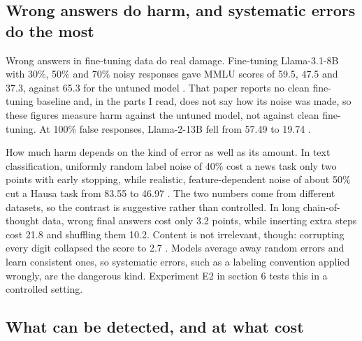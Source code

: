 \subsection{Wrong answers do harm, and systematic errors do the most}

Wrong answers in fine-tuning data do real damage. Fine-tuning Llama-3.1-8B with 30\%, 50\% and 70\% noisy responses gave MMLU scores of 59.5, 47.5 and 37.3, against 65.3 for the untuned model \citep{luo2024robustft}. That paper reports no clean fine-tuning baseline and, in the parts I read, does not say how its noise was made, so these figures measure harm against the untuned model, not against clean fine-tuning. At 100\% false responses, Llama-2-13B fell from 57.49 to 19.74 \citep{cho2024falsity}.

How much harm depends on the kind of error as well as its amount. In text classification, uniformly random label noise of 40\% cost a news task only two points with early stopping, while realistic, feature-dependent noise of about 50\% cut a Hausa task from 83.55 to 46.97 \citep{zhu2022bert}. The two numbers come from different datasets, so the contrast is suggestive rather than controlled. In long chain-of-thought data, wrong final answers cost only 3.2 points, while inserting extra steps cost 21.8 and shuffling them 10.2. Content is not irrelevant, though: corrupting every digit collapsed the score to 2.7 \citep{li2025reason}.  Models average away random errors and learn consistent ones, so systematic errors, such as a labeling convention applied wrongly, are the dangerous kind. Experiment E2 in section 6 tests this in a controlled setting.

\subsection{What can be detected, and at what cost}

